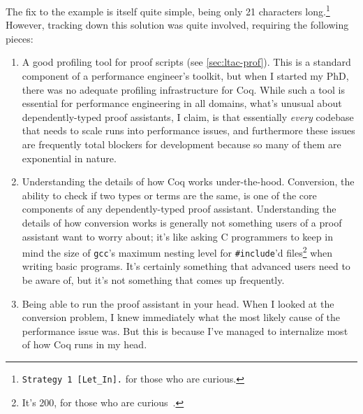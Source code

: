 The fix to the example is itself quite simple, being only 21 characters long.\footnote{\texttt{Strategy 1 [Let\_In].} for those who are curious.}
However, tracking down this solution was quite involved, requiring the following pieces:
\begin{enumerate}
  \item
    A good profiling tool for proof scripts (see \autoref{sec:ltac-prof}).
    This is a standard component of a performance engineer's toolkit, but when I started my PhD, there was no adequate profiling infrastructure for Coq.
    While such a tool is essential for performance engineering in all domains, what's unusual about dependently-typed proof assistants, I claim, is that essentially \emph{every} codebase that needs to scale runs into performance issues, and furthermore these issues are frequently total blockers for development because so many of them are exponential in nature.
  \item
    Understanding the details of how Coq works under-the-hood.
    Conversion, the ability to check if two types or terms are the same, is one of the core components of any dependently-typed proof assistant.
    Understanding the details of how conversion works is generally not something users of a proof assistant want to worry about; it's like asking C programmers to keep in mind the size of \texttt{gcc}'s maximum nesting level for \texttt{\#include}'d files\footnote{It's 200, for those who are curious~\cite{C2017FSF}.} when writing basic programs.
    It's certainly something that advanced users need to be aware of, but it's not something that comes up frequently.
  \item
    Being able to run the proof assistant in your head.
    When I looked at the conversion problem, I knew immediately what the most likely cause of the performance issue was.
    But this is because I've managed to internalize most of how Coq runs in my head.


\end{enumerate}
